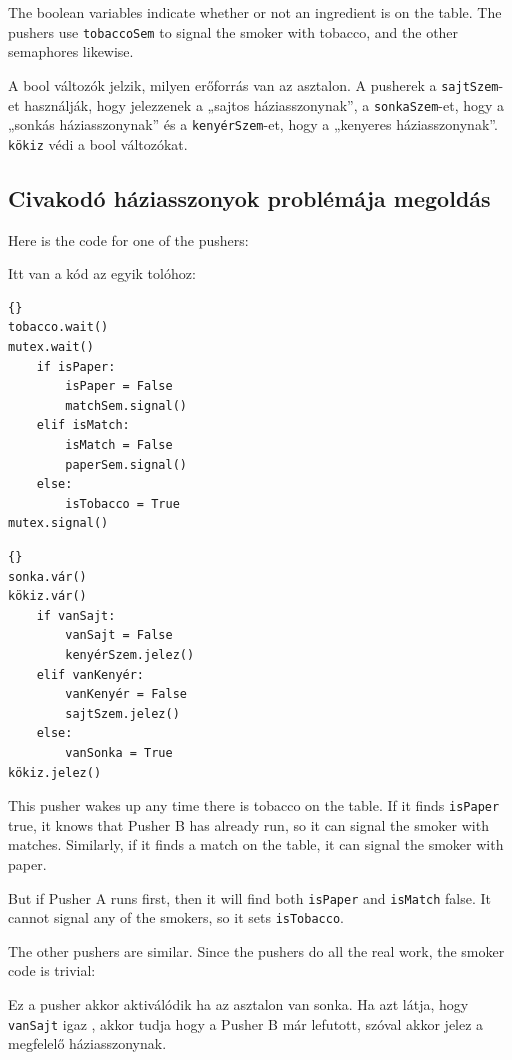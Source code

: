 \documentclass{book}
\newcommand{\clearemptydoublepage}{\newpage\cleardoublepage}
\begin{document}
The boolean variables indicate whether or not an ingredient
is on the table.  The pushers use {\tt tobaccoSem} to signal
the smoker with tobacco, and the other semaphores likewise.

A bool változók jelzik, milyen erőforrás van az asztalon.
A pusherek a {\tt sajtSzem}-et használják, hogy jelezzenek a „sajtos háziasszonynak”,
a {\tt sonkaSzem}-et, hogy a „sonkás háziasszonynak” és a {\tt kenyérSzem}-et, hogy a „kenyeres háziasszonynak”.
{\tt kökiz} védi a bool változókat.

\clearemptydoublepage
\subsection{Civakodó háziasszonyok problémája megoldás}

Here is the code for one of the pushers:

Itt van a kód az egyik tolóhoz:

\begin{lstlisting}[title={Pusher A}]{}
tobacco.wait()
mutex.wait()
    if isPaper:
        isPaper = False
        matchSem.signal()
    elif isMatch:
        isMatch = False
        paperSem.signal()
    else: 
        isTobacco = True
mutex.signal()
\end{lstlisting}

\begin{lstlisting}[title={Toló A}]{}
sonka.vár()
kökiz.vár()
    if vanSajt:
        vanSajt = False
        kenyérSzem.jelez()
    elif vanKenyér:
        vanKenyér = False
        sajtSzem.jelez()
    else: 
        vanSonka = True
kökiz.jelez()
\end{lstlisting}


This pusher wakes up any time there is tobacco on the
table.  If it finds {\tt isPaper} true, it knows that
Pusher B has already run, so it can signal the smoker
with matches.  Similarly, if it finds a match on the
table, it can signal the smoker with paper.

But if Pusher A runs first, then it will find both
{\tt isPaper} and {\tt isMatch} false.  It cannot signal
any of the smokers, so it sets {\tt isTobacco}.

The other pushers are similar.  Since the pushers do all
the real work, the smoker code is trivial:

Ez a pusher akkor aktiválódik ha az asztalon van sonka.
Ha azt látja, hogy {\tt vanSajt} igaz , akkor tudja hogy a Pusher B
már lefutott, szóval akkor jelez a megfelelő háziasszonynak.
\end{document}
